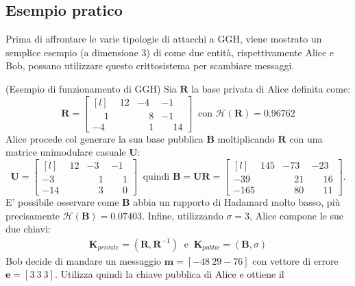 \subsection{Esempio pratico}
\label{exp:GGH}
Prima di affrontare le varie tipologie di attacchi a GGH, viene mostrato un semplice esempio
(a dimensione 3) di come due entità, rispettivamente Alice e Bob, possano utilizzare questo
crittosistema per scambiare messaggi. 
\begin{exmp} (Esempio di funzionamento di GGH)
Sia $\mathbf{R}$ la base privata di Alice definita come:
\begin{equation*}
    \mathbf{R} =
    \begin{bmatrix*}[l]
        \phantom{-}12 & -4 & -1\\
        \phantom{-}1 & \phantom{-}8 & -1\\
        -4 & \phantom{-}1 & \phantom{-}14
    \end{bmatrix*}
    \ \text{ con } \mathcal{H}(\mathbf{R}) = 0.96762
\end{equation*}
Alice procede col generare la sua base pubblica $\mathbf{B}$ moltiplicando $\mathbf{R}$ con una matrice
unimodulare casuale $\mathbf{U}$:
\begin{equation*}
    \mathbf{U} =
    \begin{bmatrix*}[l]
        \phantom{-}12 & -3 & -1\\
        -3 & \phantom{-}1 & \phantom{-}1\\
        -14 & \phantom{-}3 & \phantom{-}0
    \end{bmatrix*}
    \ \text{ quindi } \mathbf{B}=\mathbf{U}\mathbf{R} =
    \begin{bmatrix*}[l]
        \phantom{-}145 & -73 & -23\\
        -39  & \phantom{-}21 & \phantom{-}16\\
        -165  & \phantom{-}80 & \phantom{-}11
    \end{bmatrix*}.
\end{equation*}
E' possibile osservare come $\mathbf{B}$ abbia un rapporto di Hadamard molto basso, più 
precisamente $\mathcal{H}(\mathbf{B}) = 0.07403$. Infine, utilizzando $\sigma = 3$, 
Alice compone le sue due chiavi:
\begin{gather*}
    \mathbf{K}_{private} = (\mathbf{R}, \mathbf{R}^{-1}) 
    \ \text{ e } \  
    \mathbf{K}_{public} = (\mathbf{B}, \sigma)
\end{gather*}
Bob decide di mandare un messaggio $\mathbf{m} = [-48 \ 29 -76]$ con vettore di errore
$\mathbf{e} = [3 \ 3 \ 3]$. Utilizza quindi la chiave pubblica di Alice e ottiene il 

\end{exmp}
